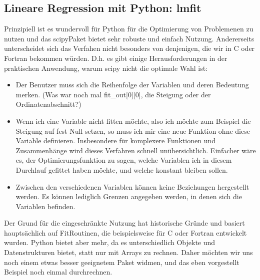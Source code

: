 \documentclass[letterpaper,10pt,english]{jupyterBook}
\begin{document}
\subsection{Lineare Regression mit Python: lmfit }
\label{\detokenize{content/T_LinReg:lineare-regression-mit-python-lmfit-a-id-subsec-lmfit-linreg-a}}
\sphinxAtStartPar
Prinzipiell ist es wundervoll für Python für die Optimierung von Problemenen zu nutzen und das scipy\sphinxhyphen{}Paket bietet sehr robuste und einfach Nutzung. Andererseits unterscheidet sich das Verfahen nicht besonders von denjenigen, die wir in C oder Fortran bekommen würden. D.h. es gibt einige Herausforderungen in der praktischen Anwendung, warum scipy nicht die optimale Wahl ist:
\begin{itemize}
\item {} 
\sphinxAtStartPar
Der Benutzer muss sich die Reihenfolge der Variablen und deren Bedeutung merken. (Was war noch mal fit\_out{[}0{]}{[}0{]}, die Steigung oder der Ordinatenabschnitt?)

\item {} 
\sphinxAtStartPar
Wenn ich eine Variable nicht fitten möchte, also ich möchte zum Beispiel die Steigung auf fest Null setzen, so muss ich mir eine neue Funktion ohne diese Variable definieren. Insbesondere für komplexere Funktionen und Zusammenhänge wird dieses Verfahren schnell unübersichtlich. Einfacher wäre es, der Optimierungsfunktion zu sagen, welche Variablen ich in diesem Durchlauf gefittet haben möchte, und welche konstant bleiben sollen.

\item {} 
\sphinxAtStartPar
Zwischen den verschiedenen Variablen können keine Beziehungen hergestellt werden. Es können lediglich Grenzen angegeben werden, in denen sich die Variablen befinden.

\end{itemize}

\sphinxAtStartPar
Der Grund für die eingeschränkte Nutzung hat historische Gründe und basiert hauptsächlich auf Fit\sphinxhyphen{}Routinen, die beispielsweise für C oder Fortran entwickelt wurden. Python bietet aber mehr, da es unterschiedlich Objekte und Datenstrukturen bietet, statt nur mit Arrays zu rechnen. Daher möchten wir uns noch einem etwas besser geeignetem Paket widmen, und das eben vorgestellt Beispiel noch einmal durchrechnen.
\end{document}
